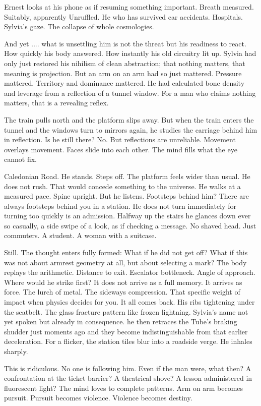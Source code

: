 Ernest looks at his phone as if resuming something important. Breath measured. Suitably, apparently Unruffled. He who has survived car accidents. Hospitals. Sylvia’s gaze. The collapse of whole cosmologies.

And yet .... what is unsettling him is not the threat but his readiness to react. How quickly his body answered. How instantly his old circuitry lit up. Sylvia had only just restored his nihilism of clean abstraction; that nothing matters, that meaning is projection. But an arm on an arm had so just mattered. Pressure mattered. Territory and dominance mattered. He had calculated bone density and leverage from a reflection of a tunnel window. For a man who claims nothing matters, that is a revealing reflex.

The train pulls north and the platform slips away. But when the train enters the tunnel and the windows turn to mirrors again, he studies the carriage behind him in reflection.
Is he still there? No. But reflections are unreliable. Movement overlays movement. Faces slide into each other. The mind fills what the eye cannot fix.

Caledonian Road. He stands. Steps off. The platform feels wider than usual. He does not rush. That would concede something to the universe. He walks at a measured pace. Spine upright. But he listens. Footsteps behind him? There are always footsteps behind you in a station. He does not turn immediately for turning too quickly is an admission.
Halfway up the stairs he glances down ever so casually, a side swipe of a look, as if checking a message. No shaved head. Just commuters. A student. A woman with a suitcase.

Still. The thought enters fully formed: What if he did not get off? What if this was not about armrest geometry at all, but about selecting a mark? The body replays the arithmetic. Distance to exit. Escalator bottleneck. Angle of approach. Where would he strike first? It does not arrive as a full memory. It arrives as force. The lurch of metal. The sideways compression. That specific weight of impact when physics decides for you. It all comes back. His ribs tightening under the seatbelt. The glass fracture pattern like frozen lightning. Sylvia’s name not yet spoken but already in consequence. he then retraces the Tube’s braking shudder just moments ago and they become indistinguishable from that earlier deceleration. For a flicker, the station tiles blur into a roadside verge. He inhales sharply.

This is ridiculous. No one is following him. Even if the man were, what then? A confrontation at the ticket barrier? A theatrical shove? A lesson administered in fluorescent light? The mind loves to complete patterns. Arm on arm becomes pursuit. Pursuit becomes violence. Violence becomes destiny.

